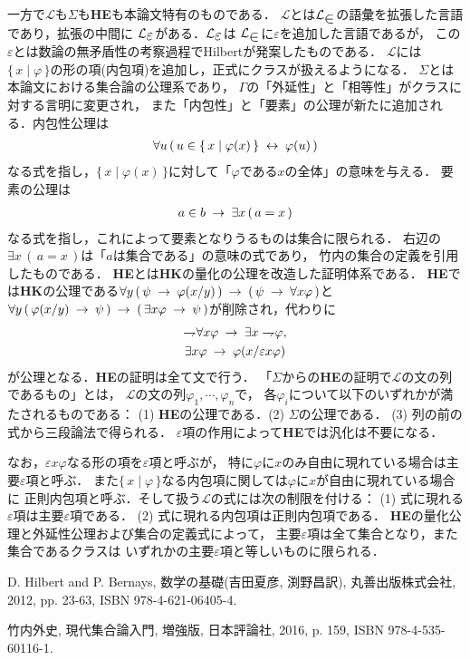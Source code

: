 \documentclass[twocolumn,10pt]{jsarticle}
\theoremstyle{mystyle}
\newcommand{\lang}[1]{\mathcal{L}_{\scalebox{1.2}{$#1$}}} %
\newcommand{\Set}[2]{\{\, #1 \mid #2\, \}} %
\newcommand{\negation}{\rightharpoondown\hspace{-0.25em}} %
\newcommand{\rarrow}{\hspace{0.25em}\rightarrow\hspace{0.25em}} %
\newcommand{\lrarrow}{\hspace{0.25em}\leftrightarrow\hspace{0.25em}} %
\begin{document}
	一方で$\mathcal{L}$も$\Sigma$も{\bf HE}も本論文特有のものである．
	$\mathcal{L}$とは$\lang{\in}$の語彙を拡張した言語であり，拡張の中間に
	$\lang{\varepsilon}$がある．$\lang{\varepsilon}$は
	$\lang{\in}$に$\varepsilon$を追加した言語であるが，
	この$\varepsilon$とは数論の無矛盾性の考察過程でHilbert\cite{Hilbert}が発案したものである．
	$\mathcal{L}$には$\Set{x}{\varphi}$の形の項(内包項)を追加し，正式にクラスが扱えるようになる．
	$\Sigma$とは本論文における集合論の公理系であり，
	$\Gamma$の「外延性」と「相等性」がクラスに対する言明に変更され，
	また「内包性」と「要素」の公理が新たに追加される．内包性公理は
	\begin{align}
		\forall u\, (\, u \in \Set{x}{\varphi(x)} \lrarrow \varphi(u)\, )
	\end{align}
	なる式を指し，$\Set{x}{\varphi(x)}$に対して「$\varphi$である$x$の全体」の意味を与える．
	要素の公理は
	\begin{align}
		a \in b \rarrow \exists x\, (\, a = x\, )
	\end{align}
	なる式を指し，これによって要素となりうるものは集合に限られる．
	右辺の$\exists x\, (\, a = x\, )$は「$a$は集合である」の意味の式であり，
	竹内\cite{TakeuchiSet}の集合の定義を引用したものである．
	{\bf HE}とは{\bf HK}の量化の公理を改造した証明体系である．
	{\bf HE}では{\bf HK}の公理である$\forall y\, (\, \psi \rarrow \varphi(x/y)\, )
	\rarrow (\, \psi \rarrow \forall x \varphi\, )$と
	$\forall y\, (\, \varphi(x/y) \rarrow \psi\, )
	\rarrow (\, \exists x \varphi \rarrow \psi\, )$が削除され，代わりに
	\begin{align}
		\begin{gathered}
			\negation \forall x \varphi \rarrow \exists x \negation \varphi, \\
			\exists x \varphi \rarrow \varphi(x/\varepsilon x \varphi)
		\end{gathered}
	\end{align}
	が公理となる．{\bf HE}の証明は全て文で行う．
	「$\Sigma$からの{\bf HE}の証明で$\mathcal{L}$の文の列であるもの」とは，
	$\mathcal{L}$の文の列$\varphi_{1},\cdots,\varphi_{n}$で，
	各$\varphi_{i}$について以下のいずれかが満たされるものである：
	(1) {\bf HE}の公理である．(2) $\Sigma$の公理である．
	(3) 列の前の式から三段論法で得られる．
	$\varepsilon$項の作用によって{\bf HE}では汎化は不要になる．
	
	なお，$\varepsilon x \varphi$なる形の項を$\varepsilon$項と呼ぶが，
	特に$\varphi$に$x$のみ自由に現れている場合は主要$\varepsilon$項と呼ぶ．
	また$\Set{x}{\varphi}$なる内包項に関しては$\varphi$に$x$が自由に現れている場合に
	正則内包項と呼ぶ．そして扱う$\mathcal{L}$の式には次の制限を付ける：
	(1) 式に現れる$\varepsilon$項は主要$\varepsilon$項である．
	(2) 式に現れる内包項は正則内包項である．
	{\bf HE}の量化公理と外延性公理および集合の定義式によって，
	主要$\varepsilon$項は全て集合となり，また集合であるクラスは
	いずれかの主要$\varepsilon$項と等しいものに限られる．
	
	\begin{thebibliography}{数字}
		 D. Hilbert and P. Bernays, 数学の基礎(吉田夏彦, 渕野昌訳), 丸善出版株式会社, 2012, pp. 23-63, ISBN 978-4-621-06405-4.
	
		 竹内外史, 現代集合論入門, 増強版, 日本評論社, 2016, p. 159, ISBN 978-4-535-60116-1.
	\end{thebibliography}
\end{document}
